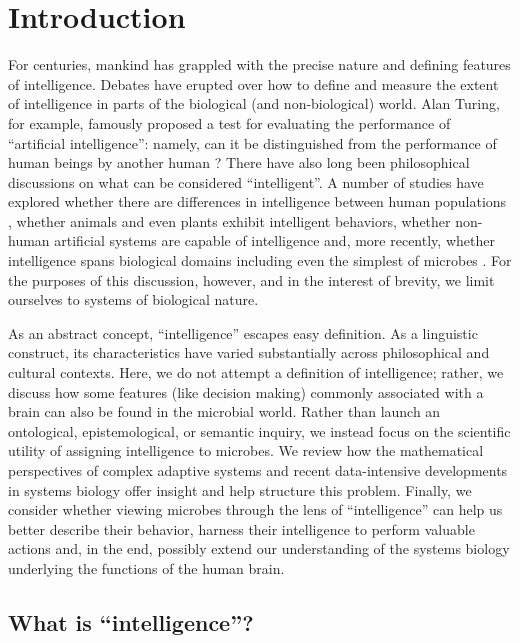 \section{Introduction}

For centuries, mankind has grappled with the precise nature and defining features of intelligence. Debates have erupted over how to define and measure the extent of intelligence in parts of the biological (and non-biological) world. Alan Turing, for example, famously proposed a test for evaluating the performance of ``artificial intelligence'': namely, can it be distinguished from the performance of human beings by another human \cite{turing_computing_1950}? There have also long been philosophical discussions on what can be considered ``intelligent''. A number of studies have explored whether there are differences in intelligence between human populations \cite{neisser_intelligence:_1996}, whether animals \cite{thorndike_animal_1998} and even plants \cite{trewavas_mindless_2002} exhibit intelligent behaviors, whether non-human artificial systems are capable of intelligence \cite{brooks_intelligence_1991} and, more recently, whether intelligence spans biological domains including even the simplest of microbes \cite{hellingwerf_signal_1995,bruggeman_macromolecular_2000,hoffer_autoamplification_2001,ben_jacob_bacterial_2004}. For the purposes of this discussion, however, and in the interest of brevity, we limit ourselves to systems of biological nature.

As an abstract concept, ``intelligence'' escapes easy definition. As a linguistic construct, its characteristics have varied substantially across philosophical and cultural contexts. Here, we do not attempt a definition of intelligence; rather, we discuss how some features (like decision making) commonly associated with a brain can also be found in the microbial world. Rather than launch an ontological, epistemological, or semantic inquiry, we instead focus on the scientific utility of assigning intelligence to microbes. We review how the mathematical perspectives of complex adaptive systems and recent data-intensive developments in systems biology offer insight and help structure this problem. Finally, we consider whether viewing microbes through the lens of ``intelligence'' can help us better describe their behavior, harness their intelligence to perform valuable actions and, in the end, possibly extend our understanding of the systems biology underlying the functions of the human brain.

\subsection{What is ``intelligence''?}

